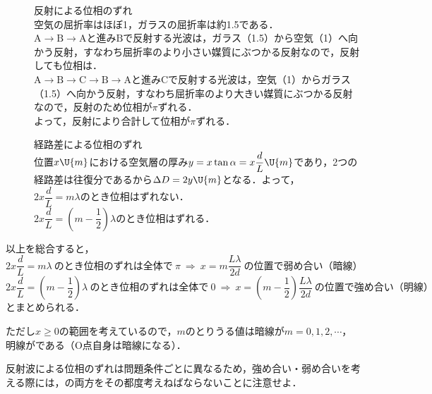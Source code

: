 \begin{description}
\item[] {\gtfamily 反射による位相のずれ}\\
空気の屈折率はほぼ1，ガラスの屈折率は約1.5である．\\
\hspace*{2zw}$\mathrm{A\to B\to A}$と進み$\mathrm{B}$で反射する光波は，ガラス（1.5）から空気（1）へ向かう反射，すなわち屈折率のより小さい媒質にぶつかる反射なので，反射しても位相は．\\
\hspace*{2zw}$\mathrm{A\to B\to C\to B\to A}$と進み$\mathrm{C}$で反射する光波は，空気（1）からガラス（1.5）へ向かう反射，すなわち屈折率のより大きい媒質にぶつかる反射なので，反射のため位相が$\pi$ずれる．\\
よって，反射により合計して位相が$\pi$ずれる．
\item[] {\gtfamily 経路差による位相のずれ}\\
位置$x\U{m}$における空気層の厚み$y=x\tan\alpha=x\dfrac{d}{L}\U{m}$であり，2つの経路差は往復分であるから$\Delta D=2y\U{m}$となる．よって，\\
\hspace*{2zw}$2x\dfrac{d}{L}=m\lambda$\hspace{4mm}のとき位相はずれない．\\
\hspace*{2zw}$2x\dfrac{d}{L}=\left(m-\dfrac{1}{2}\right)\lambda$\hspace{4mm}のとき位相は\AnaB{$\pi$}ずれる．
\end{description}

\hspace{1zw}以上を総合すると，
\[2x\dfrac{d}{L}=m\lambda\ \text{のとき位相のずれは全体で}\ \pi\ \Longrightarrow\ x=m\dfrac{L\lambda}{2d}\ \text{の位置で弱め合い（暗線）}\]
\[2x\dfrac{d}{L}=\left(m-\dfrac{1}{2}\right)\lambda\ \text{のとき位相のずれは全体で}\ 0\ \Longrightarrow\ x=\left(m-\dfrac{1}{2}\right)\dfrac{L\lambda}{2d}\ \text{の位置で強め合い（明線）}\]
とまとめられる．

\hspace{1zw}ただし$x\ge0$の範囲を考えているので，$m$のとりうる値は暗線が$m=0,1,2,\cdots$，明線がである（$\mathrm{O}$点自身は暗線になる）．

\hspace{1zw}反射波による位相のずれは問題条件ごとに異なるため，強め合い・弱め合いを考える際には，の両方をその都度考えねばならないことに注意せよ．

